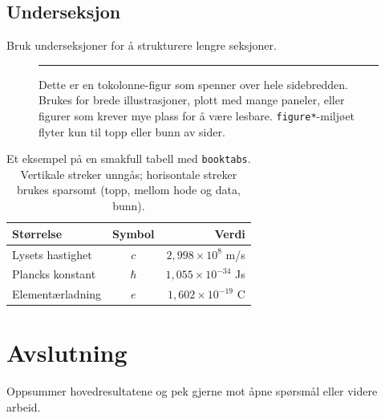 \documentclass[a4paper,10pt,twocolumn]{article}
\begin{document}
\subsection{Underseksjon}

Bruk underseksjoner for å strukturere lengre seksjoner.

\begin{figure}[t]
  \centering
  \rule{0.9\linewidth}{3.5cm}   %
  \caption{Dette er en tokolonne-figur som spenner over hele
           sidebredden. Brukes for brede illustrasjoner, plott med mange paneler, eller figurer som krever mye plass for å være lesbare. \texttt{figure*}-miljøet flyter kun til topp eller bunn av sider.}
  \label{fig:bred}
\end{figure}

\begin{table}[t]
  \centering
  \caption{Et eksempel på en smakfull tabell med \texttt{booktabs}.
           Vertikale streker unngås; horisontale streker brukes sparsomt (topp, mellom hode og data, bunn).}
  \label{tab:eksempel}
  \begin{tabular}{lcr}
    \toprule
    Størrelse & Symbol & Verdi \\
    \midrule
    Lysets hastighet   & $c$      & $2{,}998 \times 10^8$ m/s \\
    Plancks konstant   & $\hbar$  & $1{,}055 \times 10^{-34}$ Js \\
    Elementærladning   & $e$      & $1{,}602 \times 10^{-19}$ C \\
    \bottomrule
  \end{tabular}
\end{table}

\section{Avslutning}

Oppsummer hovedresultatene og pek gjerne mot åpne spørsmål eller videre arbeid.



\end{document}
